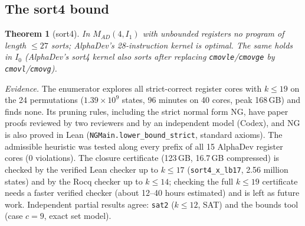 \documentclass[11pt]{article}
\newtheorem{theorem}{Theorem}\newtheorem{lemma}[theorem]{Lemma}\newtheorem{corollary}[theorem]{Corollary}
\theoremstyle{remark}\newtheorem{remark}[theorem]{Remark}
\begin{document}
\subsection{The sort4 bound}
\begin{theorem}[sort4]\label{thm:sort4}
In $M_{AD}(4, I_1)$ with unbounded registers no program of length $\le 27$ sorts; AlphaDev's 28-instruction kernel is optimal.
The same holds in $I_0$ (AlphaDev's sort4 kernel also sorts after replacing \texttt{cmovle}/\texttt{cmovge} by
\texttt{cmovl}/\texttt{cmovg}).
\end{theorem}
\emph{Evidence.} The enumerator explores all strict-correct register cores with $k \le 19$ on the 24 permutations
($1.39\times10^9$ states, 96 minutes on 40 cores, peak 168\,GB) and finds none. Its pruning rules, including the strict normal
form NG, have paper proofs reviewed by two reviewers and by an independent model (Codex), and NG is also proved in Lean
(\texttt{NGMain.lower\_bound\_strict}, standard axioms). The admissible heuristic was tested along every prefix of all 15
AlphaDev register cores (0 violations). The closure certificate (123\,GB, 16.7\,GB compressed) is checked by the verified Lean
checker up to $k \le 17$ (\texttt{sort4\_x\_lb17}, 2.56 million states) and by the Rocq checker up to $k \le 14$; checking the
full $k \le 19$ certificate needs a faster verified checker (about 12--40 hours estimated) and is left as future work.
Independent partial results agree: \texttt{sat2} ($k \le 12$, SAT) and the bounds tool (case $c = 9$, exact set model).
\end{document}
